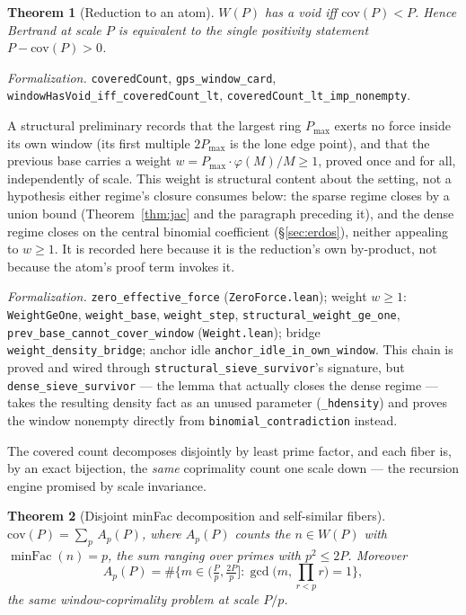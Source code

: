\documentclass[11pt,a4paper]{amsart}
\theoremstyle{plain}
\newtheorem{theorem}{Theorem}[section]
\theoremstyle{definition}
\theoremstyle{plain}
\theoremstyle{remark}
\newcommand{\lean}[1]{\textup{\texttt{#1}}}
\newcommand{\Formal}[1]{\par\smallskip\noindent\emph{Formalization.} #1\par\smallskip}
\begin{document}
\begin{theorem}[Reduction to an atom]\label{thm:atom}
$W(P)$ has a void iff $\mathrm{cov}(P)<P$. Hence Bertrand at scale $P$ is equivalent to the
single positivity statement $P-\mathrm{cov}(P)>0$.
\end{theorem}

\Formal{\lean{coveredCount}, \lean{gps\_window\_card},
\lean{windowHasVoid\_iff\_coveredCount\_lt}, \lean{coveredCount\_lt\_imp\_nonempty}.}

A structural preliminary records that the largest ring $P_{\max}$ exerts no force inside
its own window (its first multiple $2P_{\max}$ is the lone edge point), and that the
previous base carries a weight $w=P_{\max}\cdot\varphi(M)/M\ge1$, proved once and for all,
independently of scale. This weight is structural content about the setting, not a
hypothesis either regime's closure consumes below: the sparse regime closes by a union
bound (Theorem~\ref{thm:jac} and the paragraph preceding it), and the dense regime closes
on the central binomial coefficient (\S\ref{sec:erdos}), neither appealing to $w\ge1$. It is
recorded here because it is the reduction's own by-product, not because the atom's proof
term invokes it.

\Formal{\lean{zero\_effective\_force} (\lean{ZeroForce.lean}); weight
$w\ge1$: \lean{WeightGeOne}, \lean{weight\_base}, \lean{weight\_step},
\lean{structural\_weight\_ge\_one}, \lean{prev\_base\_cannot\_cover\_window}
(\lean{Weight.lean}); bridge \lean{weight\_density\_bridge}; anchor idle
\lean{anchor\_idle\_in\_own\_window}. This chain is proved and wired through
\lean{structural\_sieve\_survivor}'s signature, but \lean{dense\_sieve\_survivor} --- the
lemma that actually closes the dense regime --- takes the resulting density fact as an
unused parameter (\lean{\_hdensity}) and proves the window nonempty directly from
\lean{binomial\_contradiction} instead.}

The covered count decomposes disjointly by least prime factor, and each fiber is, by an
exact bijection, the \emph{same} coprimality count one scale down --- the recursion engine
promised by scale invariance.

\begin{theorem}[Disjoint minFac decomposition and self-similar fibers]\label{thm:fiber}
$\displaystyle \mathrm{cov}(P)=\sum_{p}\, A_p(P)$, where $A_p(P)$ counts the $n\in W(P)$
with $\operatorname{minFac}(n)=p$, the sum ranging over primes with $p^2\le 2P$. Moreover
\[
A_p(P)=\#\Big\{m\in\big(\tfrac{P}{p},\tfrac{2P}{p}\big]:
\gcd\big(m,\textstyle\prod_{r<p}r\big)=1\Big\},
\]
the same window-coprimality problem at scale $P/p$.
\end{theorem}
\end{document}
